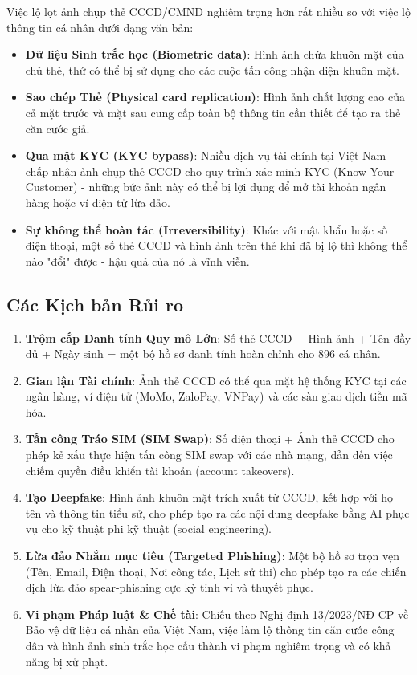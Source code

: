 \documentclass[12pt,a4paper]{article}
\begin{document}
Việc lộ lọt ảnh chụp thẻ CCCD/CMND nghiêm trọng hơn rất nhiều so với việc lộ thông tin cá nhân dưới dạng văn bản:

\begin{itemize}
    \item \textbf{Dữ liệu Sinh trắc học (Biometric data)}: Hình ảnh chứa khuôn mặt của chủ thẻ, thứ có thể bị sử dụng cho các cuộc tấn công nhận diện khuôn mặt.
    \item \textbf{Sao chép Thẻ (Physical card replication)}: Hình ảnh chất lượng cao của cả mặt trước và mặt sau cung cấp toàn bộ thông tin cần thiết để tạo ra thẻ căn cước giả.
    \item \textbf{Qua mặt KYC (KYC bypass)}: Nhiều dịch vụ tài chính tại Việt Nam chấp nhận ảnh chụp thẻ CCCD cho quy trình xác minh KYC (Know Your Customer) - những bức ảnh này có thể bị lợi dụng để mở tài khoản ngân hàng hoặc ví điện tử lừa đảo.
    \item \textbf{Sự không thể hoàn tác (Irreversibility)}: Khác với mật khẩu hoặc số điện thoại, một số thẻ CCCD và hình ảnh trên thẻ khi đã bị lộ thì không thể nào "đổi" được - hậu quả của nó là vĩnh viễn.
\end{itemize}

\subsection{Các Kịch bản Rủi ro}

\begin{enumerate}
    \item \textbf{Trộm cắp Danh tính Quy mô Lớn}: Số thẻ CCCD + Hình ảnh + Tên đầy đủ + Ngày sinh = một bộ hồ sơ danh tính hoàn chỉnh cho 896 cá nhân.
    \item \textbf{Gian lận Tài chính}: Ảnh thẻ CCCD có thể qua mặt hệ thống KYC tại các ngân hàng, ví điện tử (MoMo, ZaloPay, VNPay) và các sàn giao dịch tiền mã hóa.
    \item \textbf{Tấn công Tráo SIM (SIM Swap)}: Số điện thoại + Ảnh thẻ CCCD cho phép kẻ xấu thực hiện tấn công SIM swap với các nhà mạng, dẫn đến việc chiếm quyền điều khiển tài khoản (account takeovers).
    \item \textbf{Tạo Deepfake}: Hình ảnh khuôn mặt trích xuất từ CCCD, kết hợp với họ tên và thông tin tiểu sử, cho phép tạo ra các nội dung deepfake bằng AI phục vụ cho kỹ thuật phi kỹ thuật (social engineering).
    \item \textbf{Lừa đảo Nhắm mục tiêu (Targeted Phishing)}: Một bộ hồ sơ trọn vẹn (Tên, Email, Điện thoại, Nơi công tác, Lịch sử thi) cho phép tạo ra các chiến dịch lừa đảo spear-phishing cực kỳ tinh vi và thuyết phục.
    \item \textbf{Vi phạm Pháp luật \& Chế tài}: Chiếu theo Nghị định 13/2023/NĐ-CP về Bảo vệ dữ liệu cá nhân của Việt Nam, việc làm lộ thông tin căn cước công dân và hình ảnh sinh trắc học cấu thành vi phạm nghiêm trọng và có khả năng bị xử phạt.
\end{enumerate}
\end{document}
